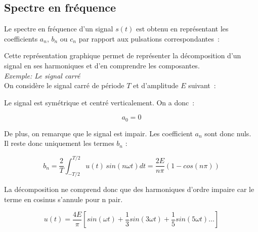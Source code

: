 \subsection*{Spectre en fréquence }

Le spectre en fréquence d'un signal $s(t)$ est obtenu en représentant les coefficients $a_n$, $b_n$ ou $c_n$ par rapport aux pulsations correspondantes~: \\

\begin{center}

\end{center}

Cette représentation graphique permet de représenter la décomposition d'un signal en ses harmoniques et d'en comprendre les composantes. \\

\textit{Exemple: Le signal carré}\\

On considère le signal carré de période $T$ et d'amplitude $E$ suivant~: 

\begin{center}

\end{center}

Le signal est symétrique et centré verticalement. On a donc~:

$$a_0 = 0$$

De plus, on remarque que le signal est impair. Les coefficient $a_n$ sont donc nuls. \\ Il reste donc uniquement les termes $b_n$ :

$$ b_n = \dfrac{2}{T} \int_{-T/2}^{T/2} u(t)\,sin(n\omega t)dt = \dfrac{2E}{n\pi} \left( 1 - cos(n\pi) \right) $$

La décomposition ne comprend donc que des harmoniques d'ordre impaire car le terme en cosinus s'annule pour n pair.\\

\begin{minipage}{0.4\textwidth}
\begin{center}

\end{center}
\end{minipage}
\begin{minipage}{0.5\textwidth}
	$$ u(t) = \dfrac{4E}{\pi}\left[ sin(\omega t) + \dfrac{1}{3} sin ( 3\omega t ) + \dfrac{1}{5} sin( 5 \omega t ) \dots \right] $$
\end{minipage}\\

